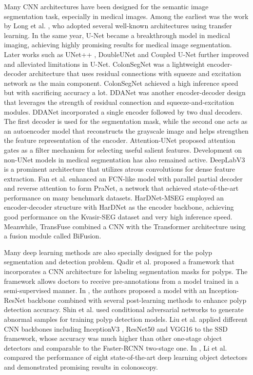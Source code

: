 \documentclass{ieeeaccess}
\begin{document}
Many CNN architectures have been designed for the semantic image segmentation task, especially in medical images. Among the earliest was the work by Long et al. \cite{long2015fully}, who adopted several well-known architectures using transfer learning. In the same year, U-Net \cite{ronneberger2015u} became a breakthrough model in medical imaging, achieving highly promising results for medical image segmentation. Later works such as UNet++ \cite{zhou2019unet++}, DoubleUNet \cite{jha2020doubleu} and Coupled U-Net \cite{tang2019cu} further improved and alleviated limitations in U-Net. ColonSegNet \cite{jha2021real} was a lightweight encoder-decoder architecture that uses residual connections with squeeze and excitation network as the main component. ColonSegNet achieved a high inference speed but with sacrificing accuracy a lot. DDANet \cite{tomar2020ddanet} was another encoder-decoder design that leverages the strength of residual connection and squeeze-and-excitation modules. DDANet incorporated a single encoder followed by two dual decoders. The first decoder is used for the segmentation mask, while the second one acts as an autoencoder model that reconstructs the grayscale image and helps strengthen the feature representation of the encoder. Attention-UNet \cite{oktay2018attention} proposed attention gates as a filter mechanism for selecting useful salient features. Development on non-UNet models in medical segmentation has also remained active. DeepLabV3 \cite{chen2017rethinking} is a prominent architecture that utilizes atrous convolutions for dense feature extraction. Fan et al. \cite{fan2020pranet} enhanced an FCN-like model with parallel partial decoder and reverse attention to form PraNet, a network that achieved state-of-the-art performance on many benchmark datasets. HarDNet-MSEG \cite{huang2021hardnet} employed an encoder-decoder structure with HarDNet as the encoder backbone, achieving good performance on the Kvasir-SEG dataset and very high inference speed. Meanwhile, TransFuse \cite{zhang2021transfuse} combined a CNN with the Transformer architecture using a fusion module called BiFusion.

Many deep learning methods are also specially designed for the polyp segmentation and detection problem. Qadir et al. \cite{qadir2019framework} proposed a framework that incorporates a CNN architecture for labeling segmentation masks for polyps. The framework allows doctors to receive pre-annotations from a model trained in a semi-supervised manner. In \cite{shin2018automatic}, the authors proposed a model with an Inception-ResNet backbone combined with several post-learning methods to enhance polyp detection accuracy. Shin et al. \cite{shin2018abnormal} used conditional adversarial networks to generate abnormal samples for training polyp detection models. Liu et al. \cite{liu2019colonic} applied different CNN backbones including InceptionV3 \cite{szegedy2015going}, ResNet50 \cite{he2016deep} and VGG16 \cite{simonyan2014very} to the SSD  framework, whose accuracy was much higher than other one-stage object detectors and comparable to the Faster-RCNN two-stage one. In \cite{li2021colonoscopy}, Li et al. compared the performance of eight state-of-the-art deep learning object detectors and demonstrated promising results in colonoscopy.
\end{document}
